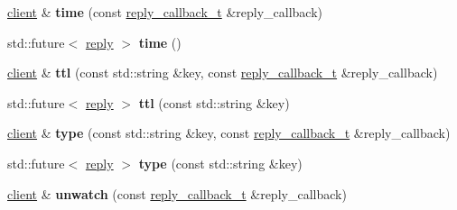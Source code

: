 \begin{DoxyCompactItemize}
\mbox{\label{classcpp__redis_1_1client_aa98df57ae17365aaf0405b60f4711e92}} 
\hyperlink{classcpp__redis_1_1client}{client} \& {\bfseries time} (const \hyperlink{classcpp__redis_1_1client_a061a1140d36d2eaeda82b09a0bb3f9f2}{reply\+\_\+callback\+\_\+t} \&reply\+\_\+callback)
\item 
\mbox{\label{classcpp__redis_1_1client_a7d0d5e0a02e97ad6d8733430489df321}} 
std\+::future$<$ \hyperlink{classcpp__redis_1_1reply}{reply} $>$ {\bfseries time} ()
\item 
\mbox{\label{classcpp__redis_1_1client_a667bb7a6ead9c8cdaba534033a467367}} 
\hyperlink{classcpp__redis_1_1client}{client} \& {\bfseries ttl} (const std\+::string \&key, const \hyperlink{classcpp__redis_1_1client_a061a1140d36d2eaeda82b09a0bb3f9f2}{reply\+\_\+callback\+\_\+t} \&reply\+\_\+callback)
\item 
\mbox{\label{classcpp__redis_1_1client_afc4697ccb77bb16ff13c425b93ef7c1d}} 
std\+::future$<$ \hyperlink{classcpp__redis_1_1reply}{reply} $>$ {\bfseries ttl} (const std\+::string \&key)
\item 
\mbox{\label{classcpp__redis_1_1client_ac284ea9a5c0e95d49a675403aaf4847c}} 
\hyperlink{classcpp__redis_1_1client}{client} \& {\bfseries type} (const std\+::string \&key, const \hyperlink{classcpp__redis_1_1client_a061a1140d36d2eaeda82b09a0bb3f9f2}{reply\+\_\+callback\+\_\+t} \&reply\+\_\+callback)
\item 
\mbox{\label{classcpp__redis_1_1client_a143f362032218fef03b3408a761b8851}} 
std\+::future$<$ \hyperlink{classcpp__redis_1_1reply}{reply} $>$ {\bfseries type} (const std\+::string \&key)
\item 
\mbox{\label{classcpp__redis_1_1client_aaf19c28495b74c8c22a8d86e80a1557e}} 
\hyperlink{classcpp__redis_1_1client}{client} \& {\bfseries unwatch} (const \hyperlink{classcpp__redis_1_1client_a061a1140d36d2eaeda82b09a0bb3f9f2}{reply\+\_\+callback\+\_\+t} \&reply\+\_\+callback)
\item 
\mbox{\label{classcpp__redis_1_1client_a006e1258d7857f2d83bd9be48945f79a}} 

\end{DoxyCompactItemize}
